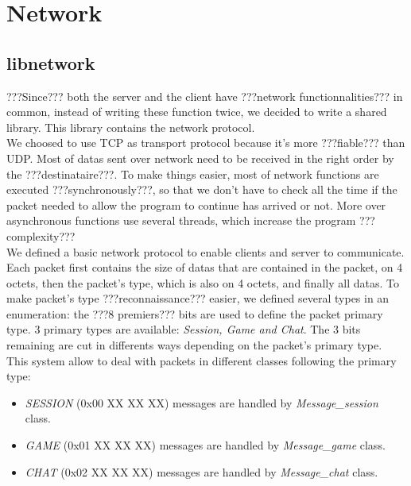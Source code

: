 \documentclass{scrreprt}
\begin{document}
		\section{Network}
		\subsection{libnetwork}
		???Since??? both the server and the client have ???network functionnalities??? in common, instead of writing these function twice, we decided to write a shared library. This library contains the network protocol.\\

			We choosed to use TCP as transport protocol because it's more ???fiable??? than UDP. Most of datas sent over network need to be received in the right order by the ???destinataire???. To make things easier, most of network functions are executed ???synchronously???, so that we don't have to check all the time if the packet needed to allow the program to continue has arrived or not. More over asynchronous functions use several threads, which increase the program ???complexity???\\

			We defined a basic network protocol to enable clients and server to communicate. Each packet first contains the size of datas that are contained in the packet, on 4 octets, then the packet's type, which is also on 4 octets, and finally all datas. To make packet's type ???reconnaissance??? easier, we defined several types in an enumeration: the ???8 premiers??? bits are used to define the packet primary type. 3 primary types are available: \emph{Session, Game and Chat}. The 3 bits remaining are cut in differents ways depending on the packet's primary type. This system allow to deal with packets in different classes following the primary type:
			\begin{itemize}
			\item{\emph{SESSION} (0x00 XX XX XX) messages are handled by \emph{Message\_session} class.}
			\item{\emph{GAME} (0x01 XX XX XX) messages are handled by \emph{Message\_game} class.}
			\item{\emph{CHAT} (0x02 XX XX XX) messages are handled by \emph{Message\_chat} class.}
			\end{itemize}

\end{document}
